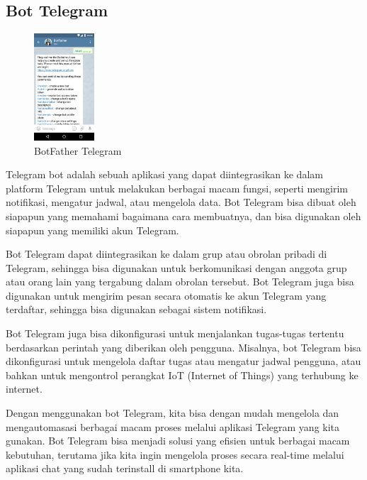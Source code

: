 \documentclass[conference]{IEEEtran}
\begin{document}
\subsection{Bot Telegram}
\vspace{0.2cm}
\begin{figure}[h]
    \centering
    \includegraphics[width=0.2\textwidth]{botfather.jpg}
    \caption{BotFather Telegram}
\end{figure}

Telegram bot adalah sebuah aplikasi yang dapat diintegrasikan ke dalam platform Telegram untuk melakukan berbagai macam fungsi, seperti mengirim notifikasi, mengatur jadwal, atau mengelola data. Bot Telegram bisa dibuat oleh siapapun yang memahami bagaimana cara membuatnya, dan bisa digunakan oleh siapapun yang memiliki akun Telegram.

Bot Telegram dapat diintegrasikan ke dalam grup atau obrolan pribadi di Telegram, sehingga bisa digunakan untuk berkomunikasi dengan anggota grup atau orang lain yang tergabung dalam obrolan tersebut. Bot Telegram juga bisa digunakan untuk mengirim pesan secara otomatis ke akun Telegram yang terdaftar, sehingga bisa digunakan sebagai sistem notifikasi.

Bot Telegram juga bisa dikonfigurasi untuk menjalankan tugas-tugas tertentu berdasarkan perintah yang diberikan oleh pengguna. Misalnya, bot Telegram bisa dikonfigurasi untuk mengelola daftar tugas atau mengatur jadwal pengguna, atau bahkan untuk mengontrol perangkat IoT (Internet of Things) yang terhubung ke internet.

Dengan menggunakan bot Telegram, kita bisa dengan mudah mengelola dan mengautomasasi berbagai macam proses melalui aplikasi Telegram yang kita gunakan. Bot Telegram bisa menjadi solusi yang efisien untuk berbagai macam kebutuhan, terutama jika kita ingin mengelola proses secara real-time melalui aplikasi chat yang sudah terinstall di smartphone kita.
\end{document}
